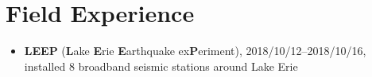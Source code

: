 \section{Field Experience}

\begin{itemize}
\item \textbf{LEEP} (\textbf{L}ake \textbf{E}rie \textbf{E}arthquake ex\textbf{P}eriment),
      2018/10/12--2018/10/16, installed 8 broadband seismic stations around Lake Erie
\end{itemize}
